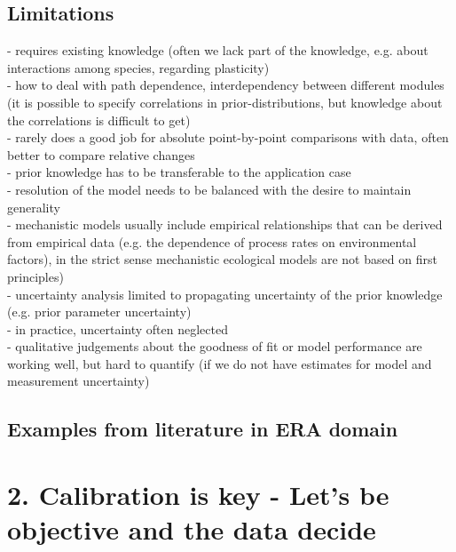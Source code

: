\documentclass [english,11pt]{article} %
\begin{document}
\subsection*{Limitations}
- requires existing knowledge (often we lack part of the knowledge, e.g. about interactions among species, regarding plasticity)\\
- how to deal with path dependence, interdependency between different modules\\
(it is possible to specify correlations in prior-distributions, but knowledge about the correlations is difficult to get)\\
- rarely does a good job for absolute point-by-point comparisons with data, often better to compare relative changes\\
- prior knowledge has to be transferable to the application case\\
- resolution  of the model needs to be balanced with the desire to maintain generality\\
- mechanistic models usually include empirical relationships that can be derived from empirical data  (e.g. the dependence of process rates on environmental factors), in the strict sense mechanistic ecological models are not based on first principles)\\
- uncertainty analysis limited to propagating uncertainty of the prior knowledge (e.g. prior parameter uncertainty)\\
- in practice, uncertainty often neglected\\
- qualitative judgements about the goodness of fit or model performance are working well, but hard to quantify (if we do not have estimates for model and measurement uncertainty) \\


\subsection*{Examples from literature in ERA domain}



\newpage  

\section*{2. Calibration is key - Let's be objective and the data decide} %
\label{sec:2}
 
\end{document}
